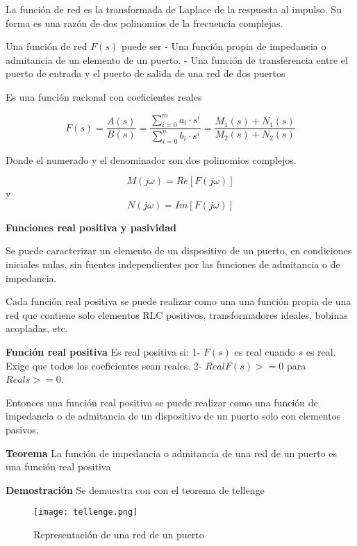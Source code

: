 \documentclass[informe.tex]{subfiles}
\begin{document}

\justify

La función de red es la transformada de Laplace de la respuesta al impulso. Su forma es una razón
de dos polinomios de la frecuencia complejas.

Una función de red $F(s)$ puede ser \newline
- Una función propia de impedancia o admitancia de un elemento de un puerto. \newline
- Una función de transferencia entre el puerto de entrada y el puerto de salida de una red de dos puertos

Es una función racional con coeficientes reales

\begin{equation}
F(s) = \frac{A(s)}{B(s)}
     = \frac{ \sum_{i=0}^{m} a_i \cdot s^{i}} 
            {\sum_{i=0}^{n} b_i \cdot s^{i}}
     = \frac{ M_1(s)+N_1(s) }{ M_2(s)+N_2(s) }
\end{equation}


Donde el numerado y el denominador son dos polinomios complejos.

\begin{equation}
M(j \omega ) = Re[F(j \omega) ] 
\end{equation} y
\begin{equation}
N(j \omega ) = Im[F(j \omega) ] 
\end{equation} 


\textbf{Funciones real positiva y pasividad}


Se puede caracterizar un elemento de un dispositivo de un puerto, en condiciones iniciales nulas, sin fuentes independientes por las funciones de admitancia o de impedancia.

Cada función real positiva se puede realizar como una una función propia de una red que contiene solo elementos RLC positivos, transformadores ideales, bobinas acopladas, etc.\newline


\textbf{Función real positiva}
Es real positiva si:
1- $F(s)$ es real cuando $s$ es real. Exige que todos los coeficientes sean reales.
2- $Real{F(s)}>=0$ para $Real{s}>=0$.\newline

Entonces una función real positiva se puede realizar como una función de impedancia o de admitancia de un dispositivo de un puerto solo con elementos pasivos.\newline

\textbf{Teorema}\newline
La función de impedancia o admitancia de una red de un puerto es una función real positiva 

\textbf{Demostración}
Se demuestra con con el teorema de tellenge

\begin{figure}[h]
		\centering
		\texttt{[image: tellenge.png]}
		\caption{Representación de una red de un puerto}
		\label{fig:realizacion_de_redes:intro:tellenge}
		\end{figure}	
\end{document}
